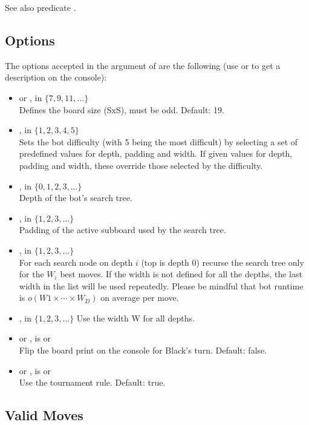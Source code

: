 \documentclass[12pt,a4paper,notitlepage]{article}
\begin{document}
See also predicate .

\subsection{Options}
\label{subsec:options}

The options accepted in the  argument of  are the following (use  or  to get a description on the console):

\begin{itemize}
\item {} or ,  in $\{7,9,11,...\}$\\
Defines the board size (SxS), must be odd.
Default: 19.
\item {},  in $\{1,2,3,4,5\}$\\
Sets the bot difficulty (with 5 being the most
difficult) by selecting a set of predefined values
for depth, padding and width. If given values for
depth, padding and width, these override those selected
by the difficulty.
\item {},  in $\{0,1,2,3,...\}$\\
Depth of the bot's search tree.
\item {},  in $\{1,2,3,...\}$\\
Padding of the active subboard used by the search tree.
\item {},  in $\{1,2,3,...\}$\\
For each search node on depth $i$ (top is depth 0)
recurse the search tree only for the $W_i$ best moves.
If the width is not defined for all the depths, the
last width in the list will be used repeatedly.
Please be mindful that bot runtime is $o(W1\times\cdots\times W_{D})$
on average per move.
\item {},  in $\{1,2,3,...\}$
Use the width W for all depths.
\item {} or ,  is  or \\
Flip the board print on the console for Black's turn.
Default: false.
\item {} or ,  is  or \\
Use the tournament rule.
Default: true.
\end{itemize}

\subsection{Valid Moves}
\label{subsec:validmoves}
\end{document}
